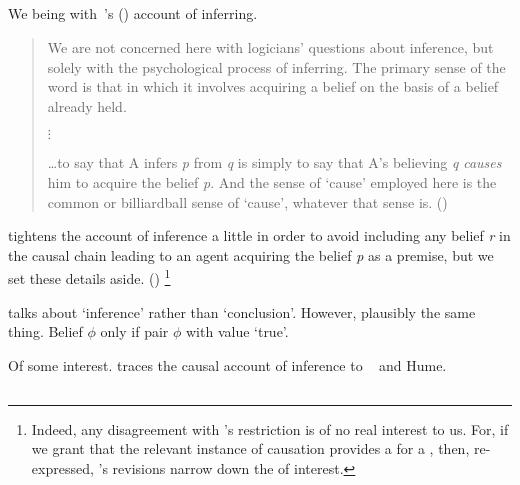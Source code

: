 \subsection{\textcite{Armstrong:1968vh}}

\begin{note}
  We being with~\cite{Armstrong:1968vh}'s (\citeyear{Armstrong:1968vh}) account of inferring.

  \begin{quote}
    We are not concerned here with logicians' questions about inference, but solely with the psychological process of inferring.
    The primary sense of the word is that in which it involves acquiring a belief on the basis of a belief already held.

    \mbox{}\hfill\(\vdots\)\hfill\mbox{}

    \dots to say that A infers \emph{p} from \emph{q} is simply to say that A's believing \emph{q} \emph{causes} him to acquire the belief \emph{p}.
    And the sense of `cause' employed here is the common or billiardball sense of `cause', whatever that sense is.%
    \mbox{}\hfill\mbox{(\citeyear[194]{Armstrong:1968vh})}
  \end{quote}

  \citeauthor{Armstrong:1968vh} tightens the account of inference a little in order to avoid including any belief \emph{r} in the causal chain leading to an agent acquiring the belief \emph{p} as a premise, but we set these details aside.
  (\citeyear[195--197]{Armstrong:1968vh})%
  \footnote{
    Indeed, any disagreement with \citeauthor{Armstrong:1968vh}'s restriction is of no real interest to us.
    For, if we grant that the relevant instance of causation provides a \wit{} for a \ros{}, then, re-expressed, \citeauthor{Armstrong:1968vh}'s revisions narrow down the  of interest.
  }

  \citeauthor{Armstrong:1968vh} talks about `inference' rather than `conclusion'.
  However, plausibly the same thing.
  Belief \(\phi\) only if pair \(\phi\) with value `true'.
\end{note}

\begin{note}
  Of some interest.
  \citeauthor{Armstrong:1968vh} traces the causal account of inference to ~\citeauthor{Moore:1962up} and Hume.
\end{note}

\subsection{\textcite{Boghossian:2014aa}}

